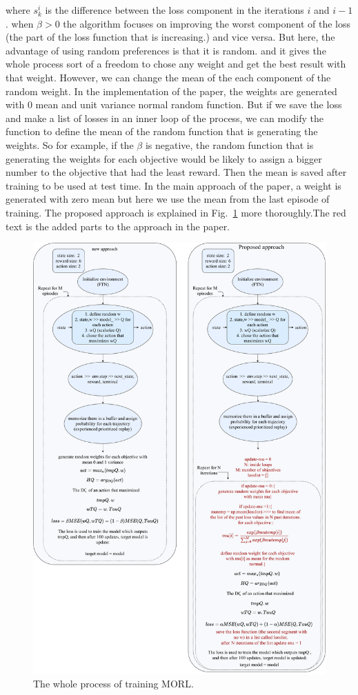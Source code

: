 \documentclass[11pt,onecolumn]{IEEEtran}
\begin{document}
where $s_{k}^{i}$ is the difference between the loss component in the iterations $i$ and $i-1$. when $\beta>0$ the algorithm focuses on improving the worst component of the loss (the part of the loss function that is increasing.) and vice versa. But here, the advantage of using random preferences is that it is random. and it gives the whole process sort of a freedom to chose any weight and get the best result with that weight. However, we can change the mean of the each component of the random weight. In the implementation of the paper, the weights are generated with 0 mean and unit variance normal random function. But if we save the loss and make a list of losses in an inner loop of the process, we can modify the function to define the mean of the random function that is generating the weights. So for example, if the $\beta$ is negative, the random function that is generating the weights for each objective would be likely to assign a bigger number to the objective that had the least reward. Then the mean is saved after training to be used at test time. In the main approach of the paper, a weight is generated with zero mean but here we use the mean from the last episode of training. The proposed approach is explained in Fig.~\ref{fig:proposed} more thoroughly.The red text is the added parts to the approach in the paper.

\begin{figure}[!htb]
    \centering
    \includegraphics[width=0.8\linewidth]{proposed.pdf}
    \caption{The whole process of training MORL.}
    \label{fig:proposed}
\end{figure}
\end{document}
